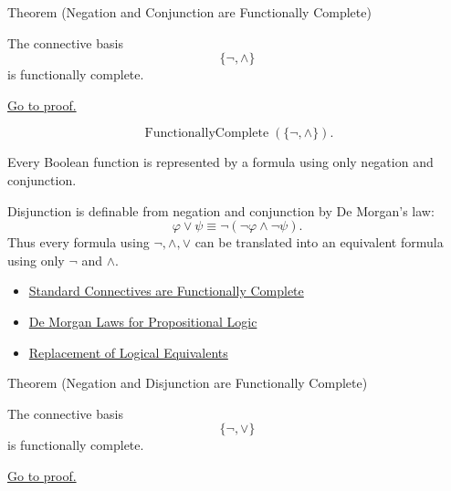 \begin{theorembox}{Theorem (Negation and Conjunction are Functionally Complete)}
\begin{theorem}
\label{thm:negation-conjunction-functionally-complete-propositional-logic}
The connective basis
\[
\{\neg,\land\}
\]
is functionally complete.

\noindent\hyperref[prf:negation-conjunction-functionally-complete-propositional-logic]{Go to proof.}
\end{theorem}
\end{theorembox}

\begin{remark*}
\[
\operatorname{FunctionallyComplete}(\{\neg,\land\}).
\]
\end{remark*}

\begin{remark*}
Every Boolean function is represented by a formula using only negation and
conjunction.
\end{remark*}

\begin{remark*}[Interpretation]
Disjunction is definable from negation and conjunction by De Morgan's law:
\[
\varphi\lor\psi\equiv\neg(\neg\varphi\land\neg\psi).
\]
Thus every formula using \(\neg,\land,\lor\) can be translated into an equivalent
formula using only \(\neg\) and \(\land\).
\end{remark*}

\begin{dependencies}
\begin{itemize}
  \item \hyperref[thm:standard-connectives-functionally-complete-propositional-logic]{Standard Connectives are Functionally Complete}
  \item \hyperref[thm:de-morgan-laws-propositional-logic]{De Morgan Laws for Propositional Logic}
  \item \hyperref[thm:replacement-of-logical-equivalents-propositional-logic]{Replacement of Logical Equivalents}
\end{itemize}
\end{dependencies}

\begin{theorembox}{Theorem (Negation and Disjunction are Functionally Complete)}
\begin{theorem}
\label{thm:negation-disjunction-functionally-complete-propositional-logic}
The connective basis
\[
\{\neg,\lor\}
\]
is functionally complete.

\noindent\hyperref[prf:negation-disjunction-functionally-complete-propositional-logic]{Go to proof.}
\end{theorem}
\end{theorembox}

